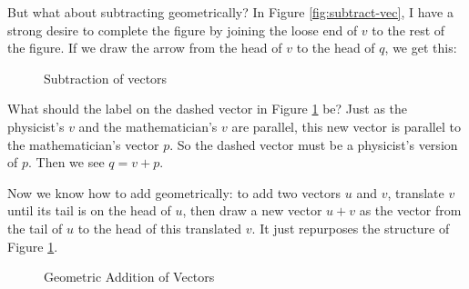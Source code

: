 \documentclass[00-livre-main.tex]{subfiles}
\begin{document}
But what about subtracting geometrically? In Figure \ref{fig:subtract-vec}, I have a strong desire to complete the figure by joining the loose end of $v$ to the rest of the figure. If we draw the arrow from the head of $v$ to the head of $q$, we get this:
\begin{figure}[h!]
\centering
{}
\caption{Subtraction of vectors}
\label{fig:add-vec}
\end{figure}

What should the label on the dashed vector in Figure \ref{fig:add-vec} be? Just as the physicist's $v$ and the
mathematician's $v$ are parallel, this new vector is parallel to the mathematician's vector $p$.
So the dashed vector must be a physicist's version of $p$. Then we see $q=v+p$.

Now we know how to add geometrically: to add two vectors $u$ and $v$, translate $v$ until its tail is on the head of $u$, then draw a new vector $u+v$ as the vector from the tail of $u$ to the head of this translated $v$. It just repurposes the structure of Figure \ref{fig:add-vec}.

\begin{figure}[h!]
\centering
{}
\caption{Geometric Addition of Vectors}
\label{fig:geom-add-vec}
\end{figure}
\end{document}
